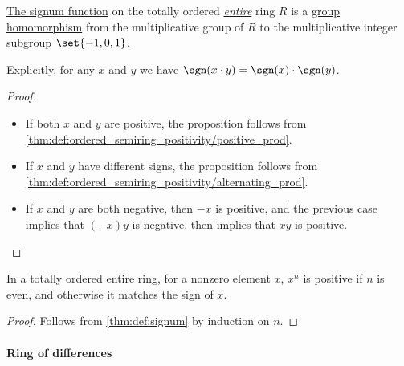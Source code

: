 \begin{proposition}\label{thm:def:signum}
  \hyperref[def:signum]{The signum function} on the totally ordered \emph{\hyperref[def:entire_semiring]{entire}} ring \( R \) is a \hyperref[def:group/morphism]{group homomorphism} from the multiplicative group of \( R \) to the multiplicative integer subgroup \( \set{ -1, 0, 1 } \).

  Explicitly, for any \( x \) and \( y \) we have \( \sgn(x \cdot y) = \sgn(x) \cdot \sgn(y) \).
\end{proposition}
\begin{proof}
  \hfill
  \begin{itemize}
    \item If both \( x \) and \( y \) are positive, the proposition follows from \cref{thm:def:ordered_semiring_positivity/positive_prod}.
    \item If \( x \) and \( y \) have different signs, the proposition follows from \cref{thm:def:ordered_semiring_positivity/alternating_prod}.
    \item If \( x \) and \( y \) are both negative, then \( -x \) is positive, and the previous case implies that \( (-x)y \) is negative.  then implies that \( xy \) is positive.
  \end{itemize}
\end{proof}

\begin{corollary}\label{thm:ordered_ring_power}
  In a totally ordered entire ring, for a nonzero element \( x \), \( x^n \) is positive if \( n \) is even, and otherwise it matches the sign of \( x \).
\end{corollary}
\begin{proof}
  Follows from \cref{thm:def:signum} by induction on \( n \).
\end{proof}

\paragraph{Ring of differences}

